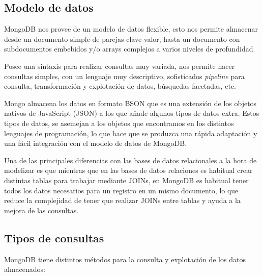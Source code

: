 \subsection{Modelo de datos}\label{datamodelmongo}

MongoDB nos provee de un modelo de datos flexible, esto nos permite almacenar desde un documento simple de parejas clave-valor, hasta un documento con subdocumentos embebidos y/o arrays complejos a varios niveles de profundidad.

Posee una sintaxis para realizar consultas muy variada, nos permite hacer consultas simples, con un lenguaje muy descriptivo, sofisticados \textit{pipeline} para consulta, transformación y explotación de datos, búsquedas facetadas, etc.

Mongo almacena los datos en formato BSON \cite{bsonspec} que es una extensión de los objetos nativos de JavaScript (JSON) a los que añade algunos tipos de datos extra. Estos tipos de datos, se asemejan a los objetos que encontramos en los distintos lenguajes de programación, lo que hace que se produzca una rápida adaptación y una fácil integración con el modelo de datos de MongoDB.

Una de las principales diferencias con las bases de datos relacionales a la hora de modelizar es que mientras que en las bases de datos relaciones es habitual crear distintas tablas para trabajar mediante JOINs, en MongoDB es habitual tener todos los datos necesarios para un registro en un mismo documento, lo que reduce la complejidad de tener que realizar JOINs entre tablas y ayuda a la mejora de las consultas.

\subsection{Tipos de consultas}

MongoDB tiene distintos métodos para la consulta y explotación de los datos almacenados:

